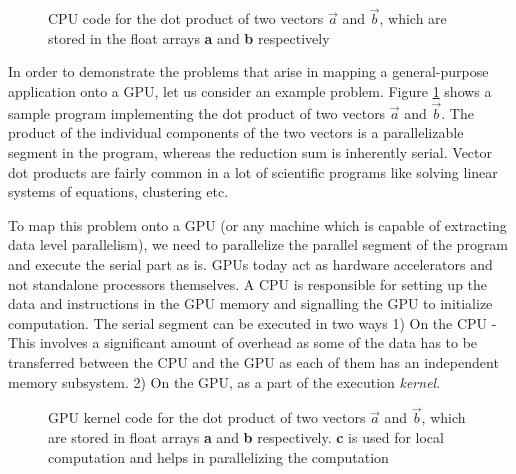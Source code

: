%
%

\label{sec:motivation}
\begin{figure}
	
	\caption{CPU code for the dot product of two vectors $\vec{a}$ and $\vec{b}$, which are stored in the float arrays \textbf{a} and \textbf{b} respectively
		\label{fig:cpu_vector_dot_code}}
\end{figure}
\par{In order to demonstrate the problems that arise in mapping a general-purpose application onto a GPU, let us consider an example problem. Figure \ref{fig:cpu_vector_dot_code} shows a sample program implementing the dot product of two vectors $\vec{a}$ and $\vec{b}$. The product of the individual components of the two vectors is a parallelizable segment in the program, whereas the reduction sum is inherently serial. Vector dot products are fairly common in a lot of scientific programs like solving linear systems of equations, clustering etc.}

\par{To map this problem onto a GPU (or any machine which is capable of extracting data level parallelism), we need to parallelize the parallel segment of the program and execute the serial part as is. GPUs today act as hardware accelerators and not standalone processors themselves. A CPU is responsible for setting up the data and instructions in the GPU memory and signalling the GPU to initialize computation. The serial segment can be executed in two ways 1) On the CPU - This involves a significant amount of overhead as some of the data has to be transferred between the CPU and the GPU as each of them has an independent memory subsystem. 2) On the GPU, as a part of the execution \textit{kernel}.}

\begin{figure}
	\centering
	
	\caption{GPU kernel code for the dot product of two vectors $\vec{a}$ and $\vec{b}$, which are stored in float arrays \textbf{a} and \textbf{b} respectively. \textbf{c} is used for local computation and helps in parallelizing the computation
		\label{fig:gpu_vector_dot_code}}
\end{figure}

